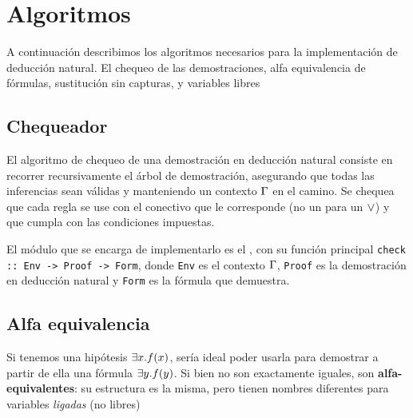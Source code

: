 \section{Algoritmos}

A continuación describimos los algoritmos necesarios para la implementación de deducción natural. El chequeo de las demostraciones, alfa equivalencia de fórmulas, sustitución sin capturas, y variables libres

\subsection{Chequeador}
\label{nd:sec:checker}

El algoritmo de chequeo de una demostración en deducción natural consiste en recorrer recursivamente el árbol de demostración, asegurando que todas las inferencias sean válidas y manteniendo un contexto $\Gamma$ en el camino.
Se chequea que cada regla se use con el conectivo que le corresponde (no un  para un $\vee$) y que cumpla con las condiciones impuestas.

El módulo que se encarga de implementarlo es el \modChecker, con su función principal \texttt{check :: Env -> Proof -> Form},
donde \texttt{Env} es el contexto $\Gamma$, \texttt{Proof} es la demostración en deducción natural y \texttt{Form} es la fórmula que demuestra.

\subsection{Alfa equivalencia}

Si tenemos una hipótesis $\exists x . f(x)$, sería ideal poder usarla para demostrar a partir de ella una fórmula $\exists y . f(y)$. Si bien no son exactamente iguales, son \textbf{alfa-equivalentes}: su estructura es la misma, pero tienen nombres diferentes para variables \textit{ligadas} (no libres)

